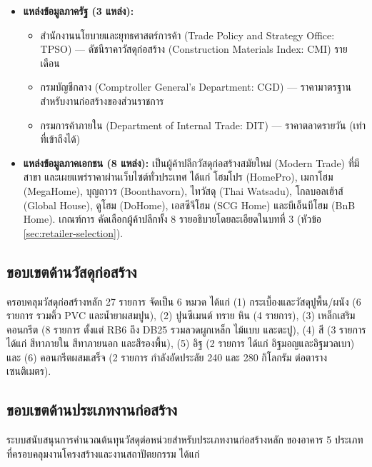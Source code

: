 \begin{itemize}[leftmargin=2em]
  \item \textbf{แหล่งข้อมูลภาครัฐ (3 แหล่ง):}
        \begin{itemize}
          \item สำนักงานนโยบายและยุทธศาสตร์การค้า (Trade Policy and
                Strategy Office: TPSO) — ดัชนีราคาวัสดุก่อสร้าง
                (Construction Materials Index: CMI) รายเดือน
          \item กรมบัญชีกลาง (Comptroller General's Department: CGD)
                — ราคามาตรฐานสำหรับงานก่อสร้างของส่วนราชการ
          \item กรมการค้าภายใน (Department of Internal Trade: DIT)
                — ราคาตลาดรายวัน (เท่าที่เข้าถึงได้)
        \end{itemize}
  \item \textbf{แหล่งข้อมูลภาคเอกชน (8 แหล่ง):}
        เป็นผู้ค้าปลีกวัสดุก่อสร้างสมัยใหม่ (Modern Trade) ที่มีสาขา
        และเผยแพร่ราคาผ่านเว็บไซต์ทั่วประเทศ ได้แก่ โฮมโปร (HomePro),
        เมกาโฮม (MegaHome), บุญถาวร (Boonthavorn), ไทวัสดุ
        (Thai Watsadu), โกลบอลเฮ้าส์ (Global House), ดูโฮม (DoHome),
        เอสซีจีโฮม (SCG Home) และบีเอ็นบีโฮม (BnB Home). เกณฑ์การ
        คัดเลือกผู้ค้าปลีกทั้ง 8 รายอธิบายโดยละเอียดในบทที่ 3
        (หัวข้อ \ref{sec:retailer-selection}).
\end{itemize}

\subsection{ขอบเขตด้านวัสดุก่อสร้าง}

ครอบคลุมวัสดุก่อสร้างหลัก 27 รายการ จัดเป็น 6 หมวด ได้แก่
(1) กระเบื้องและวัสดุปูพื้น/ผนัง (6 รายการ รวมคิ้ว PVC และน้ำยาผสมปูน),
(2) ปูนซีเมนต์ ทราย หิน (4 รายการ),
(3) เหล็กเสริมคอนกรีต (8 รายการ ตั้งแต่ RB6 ถึง DB25 รวมลวดผูกเหล็ก
ไม้แบบ และตะปู),
(4) สี (3 รายการ ได้แก่ สีทาภายใน สีทาภายนอก และสีรองพื้น),
(5) อิฐ (2 รายการ ได้แก่ อิฐมอญและอิฐมวลเบา) และ
(6) คอนกรีตผสมเสร็จ (2 รายการ กำลังอัดประลัย 240 และ 280 กิโลกรัม
ต่อตารางเซนติเมตร).

\subsection{ขอบเขตด้านประเภทงานก่อสร้าง}
\label{sec:scope-work-types}

ระบบสนับสนุนการคำนวณต้นทุนวัสดุต่อหน่วยสำหรับประเภทงานก่อสร้างหลัก
ของอาคาร 5 ประเภท ที่ครอบคลุมงานโครงสร้างและงานสถาปัตยกรรม ได้แก่

